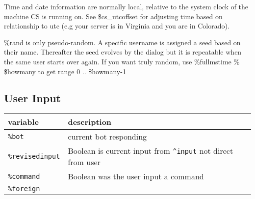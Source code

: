 \documentclass[]{article}
\begin{document}
Time and date information are normally local, relative to the system
clock of the machine CS is running on. See \$cs\_utcoffset for adjusting
time based on relationship to utc (e.g your server is in Virginia and
you are in Colorado).

\%rand is only pseudo-random. A specific username is assigned a seed
based on their name. Thereafter the seed evolves by the dialog but it is
repeatable when the same user starts over again. If you want truly
random, use \%fullmstime \% \$howmany to get range 0 .. \$howmany-1

\subsection{User Input}\label{user-input}

\begin{longtable}[]{@{}ll@{}}
\toprule
\begin{minipage}[b]{0.26\columnwidth}\raggedright\strut
variable\strut
\end{minipage} & \begin{minipage}[b]{0.10\columnwidth}\raggedright\strut
description\strut
\end{minipage}\tabularnewline
\midrule
\endhead
\begin{minipage}[t]{0.26\columnwidth}\raggedright\strut
\texttt{\%bot}\strut
\end{minipage} & \begin{minipage}[t]{0.10\columnwidth}\raggedright\strut
current bot responding\strut
\end{minipage}\tabularnewline
\begin{minipage}[t]{0.26\columnwidth}\raggedright\strut
\texttt{\%revisedinput}\strut
\end{minipage} & \begin{minipage}[t]{0.10\columnwidth}\raggedright\strut
Boolean is current input from \texttt{\^{}input} not direct from
user\strut
\end{minipage}\tabularnewline
\begin{minipage}[t]{0.26\columnwidth}\raggedright\strut
\texttt{\%command}\strut
\end{minipage} & \begin{minipage}[t]{0.10\columnwidth}\raggedright\strut
Boolean was the user input a command\strut
\end{minipage}\tabularnewline
\begin{minipage}[t]{0.26\columnwidth}\raggedright\strut
\texttt{\%foreign}\strut
\end{minipage} & \begin{minipage}[t]{0.10\columnwidth}\raggedright\strut

\end{minipage}
\end{longtable}
\end{document}
